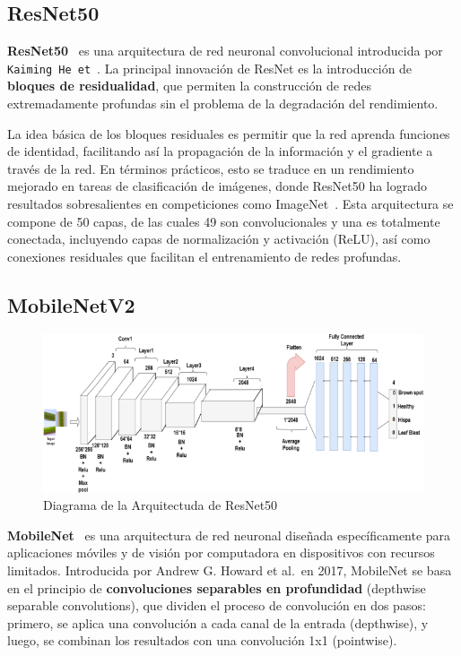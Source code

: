 \subsection{ResNet50}\label{subsec:resnet50}
\textbf{ResNet50}~\cite{ResNet50} es una arquitectura de red neuronal convolucional introducida por
\texttt{Kaiming He et}~\cite{heDeepResidualLearning2016}.
La principal innovación de ResNet es la introducción de \textbf{bloques de residualidad}, que permiten la construcción
de redes extremadamente profundas sin el problema de la degradación del rendimiento.


La idea básica de los bloques residuales es permitir que la red aprenda funciones de identidad, facilitando así la
propagación de la información y el gradiente a través de la red.
En términos prácticos, esto se traduce en un rendimiento mejorado en tareas de clasificación de imágenes, donde
ResNet50 ha logrado resultados sobresalientes en competiciones como ImageNet~\cite{alnuaimHumanComputerInteractionHand2022}.
Esta arquitectura se compone de 50 capas, de las cuales 49 son convolucionales y una es totalmente conectada,
incluyendo capas de normalización y activación (ReLU), así como conexiones residuales que facilitan el entrenamiento de
redes profundas.

\subsection{MobileNetV2}\label{subsec:mobilenet}

\begin{figure}[htp] \label{fig:resnet50}
    \begin{center}
        \includegraphics[width=1\textwidth]{imagenes/resnet50}
    \end{center}
    \caption[ResNet50]{Diagrama de la Arquitectuda de ResNet50}
\end{figure}

\textbf{MobileNet}~\cite{howardMobileNetsEfficientConvolutional2017} es una arquitectura de red neuronal diseñada específicamente para
aplicaciones móviles y de visión por computadora en dispositivos con recursos limitados.
Introducida por Andrew G. Howard et al.\ en 2017, MobileNet se basa en el principio de
\textbf{convoluciones separables en profundidad} (depthwise separable convolutions), que dividen el proceso de
convolución en dos pasos: primero, se aplica una convolución a cada canal de la entrada (depthwise), y luego, se
combinan los resultados con una convolución 1x1 (pointwise).


